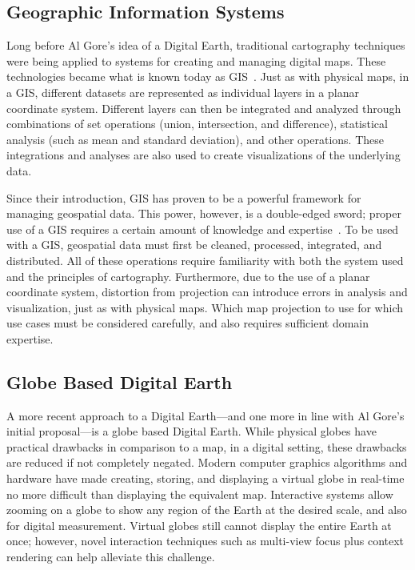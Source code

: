 \subsection{Geographic Information Systems}
Long before Al Gore's idea of a Digital Earth, traditional cartography techniques were being applied to systems for creating and managing digital maps.
These technologies became what is known today as GIS~\cite{foresman1998history}.
Just as with physical maps, in a GIS, different datasets are represented as individual layers in a planar coordinate system.
Different layers can then be integrated and analyzed through combinations of set operations (union, intersection, and difference), statistical analysis (such as mean and standard deviation), and other operations.
These integrations and analyses are also used to create visualizations of the underlying data.


Since their introduction, GIS has proven to be a powerful framework for managing geospatial data.
This power, however, is a double-edged sword; proper use of a GIS requires a certain amount of knowledge and expertise~\cite{antenucci1991geographic}.
To be used with a GIS, geospatial data must first be cleaned, processed, integrated, and distributed.
All of these operations require familiarity with both the system used and the principles of cartography.
Furthermore, due to the use of a planar coordinate system, distortion from projection can introduce errors in analysis and visualization, just as with physical maps.
Which map projection to use for which use cases must be considered carefully, and also requires sufficient domain expertise.


\subsection{Globe Based Digital Earth}
A more recent approach to a Digital Earth---and one more in line with Al Gore's initial proposal---is a globe based Digital Earth.
While physical globes have practical drawbacks in comparison to a map, in a digital setting, these drawbacks are reduced if not completely negated. 
Modern computer graphics algorithms and hardware have made creating, storing, and displaying a virtual globe in real-time no more difficult than displaying the equivalent map.
Interactive systems allow zooming on a globe to show any region of the Earth at the desired scale, and also for digital measurement.
Virtual globes still cannot display the entire Earth at once; however, novel interaction techniques such as multi-view focus plus context rendering can help alleviate this challenge.


